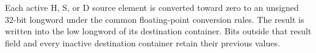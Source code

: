 Each active H, S, or D source element is converted toward zero to an unsigned
32-bit longword under the common floating-point conversion rules. The result
is written into the low longword of its destination container. Bits outside
that result field and every inactive destination container retain their
previous values.
